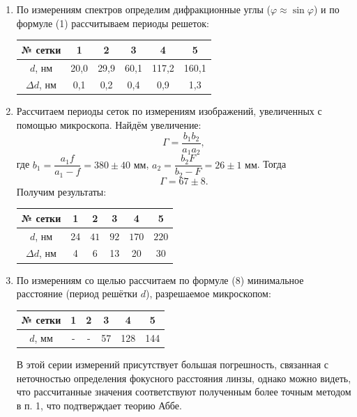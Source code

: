 \documentclass[a4paper,12pt]{article}
\begin{document}
\begin{enumerate}
	\item По измерениям спектров определим дифракционные углы ($\varphi\approx\sin\varphi$) и по формуле (1) рассчитываем периоды решеток:
	
	\begin{center}
		\begin{tabular}{|c|c|c|c|c|c|}
			\hline
			№ сетки & 1 & 2 & 3 & 4 & 5 \\ \hline
			$d$, нм & 20,0 & 29,9 & 60,1 & 117,2 & 160,1 \\ \hline
			$\Delta d$, нм & 0,1 & 0,2 & 0,4 & 0,9 & 1,3 \\ \hline
		\end{tabular}
	\end{center}
	
	
	\item Рассчитаем периоды сеток по измерениям изображений, увеличенных с помощью микроскопа. Найдём увеличение:
	\begin{equation*}
	\Gamma = \dfrac{b_1b_2}{a_1a_2},
	\end{equation*}                                                                    где $b_1 = \dfrac{a_1f}{a_1 - f} = 380\pm40\text{ мм}$, $a_2 = \dfrac{b_2F}{b_2 - F} = 26\pm1\text{ мм}$. Тогда                                                                                                   
	\begin{equation*}
	\Gamma = 67\pm8.
	\end{equation*}
	Получим результаты:
	\begin{center}
		\begin{tabular}{|c|c|c|c|c|c|}
			\hline
			№ сетки & 1 & 2 & 3 & 4 & 5 \\ \hline
			$d$, нм & 24 & $41$ & $92$ & $170$ & $220$ \\ \hline
			$\Delta d$, нм & 4 & 6 & 13 & 20 & 30 \\ \hline
		\end{tabular}
	\end{center}
	
	\item По измерениям со щелью рассчитаем по формуле (8) минимальное расстояние (период решётки $d$), разрешаемое микроскопом:
	\begin{center}
		\begin{tabular}{|c|c|c|c|c|c|}
			\hline
			№ сетки & 1 & 2 & 3 & 4 & 5 \\ \hline
			$d$, мм & - & - & 57 & 128 & 144 \\ \hline
		\end{tabular}
	\end{center}
В этой серии измерений присутствует большая погрешность, связанная с неточностью определения фокусного расстояния линзы, однако можно видеть, что рассчитанные значения соответствуют полученным более точным методом в п. 1, что подтверждает теорию Аббе. 
\end{enumerate}
\end{document}
